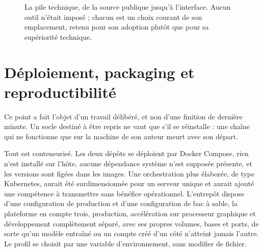 \begin{figure}[H]
\caption{La pile technique, de la source publique jusqu'à l'interface. Aucun outil n'était
imposé ; chacun est un choix courant de son emplacement, retenu pour son adoption plutôt que
pour sa supériorité technique.}
\label{fig:pile}
\end{figure}

\section{Déploiement, packaging et reproductibilité}

Ce point a fait l'objet d'un travail délibéré, et non d'une finition de dernière minute. Un
socle destiné à être repris ne vaut que s'il se réinstalle : une chaîne qui ne fonctionne que
sur la machine de son auteur meurt avec son départ.

Tout est conteneurisé. Les deux dépôts se déploient par Docker Compose, rien n'est installé sur
l'hôte, aucune dépendance système n'est supposée présente, et les versions sont figées dans les
images. Une orchestration plus élaborée, de type Kubernetes, aurait été surdimensionnée pour un
serveur unique et aurait ajouté une compétence à transmettre sans bénéfice opérationnel.
L'entrepôt dispose d'une configuration de production et d'une configuration de bac à sable, la
plateforme en compte trois, production, accélération sur processeur graphique et développement
complètement séparé, avec ses propres volumes, bases et ports, de sorte qu'un modèle entraîné ou
un compte créé d'un côté n'atteint jamais l'autre. Le profil se choisit par une variable
d'environnement, sans modifier de fichier.

